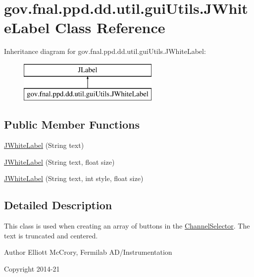 \hypertarget{classgov_1_1fnal_1_1ppd_1_1dd_1_1util_1_1guiUtils_1_1JWhiteLabel}{\section{gov.\-fnal.\-ppd.\-dd.\-util.\-gui\-Utils.\-J\-White\-Label Class Reference}
\label{classgov_1_1fnal_1_1ppd_1_1dd_1_1util_1_1guiUtils_1_1JWhiteLabel}
}
Inheritance diagram for gov.\-fnal.\-ppd.\-dd.\-util.\-gui\-Utils.\-J\-White\-Label\-:\begin{figure}[H]
\begin{center}
\leavevmode
\includegraphics[height=2.000000cm]{classgov_1_1fnal_1_1ppd_1_1dd_1_1util_1_1guiUtils_1_1JWhiteLabel}
\end{center}
\end{figure}
\subsection*{Public Member Functions}
\begin{DoxyCompactItemize}
\item 
\hyperlink{classgov_1_1fnal_1_1ppd_1_1dd_1_1util_1_1guiUtils_1_1JWhiteLabel_aba0b416af91c261f39ba3a495a04c7cc}{J\-White\-Label} (String text)
\item 
\hyperlink{classgov_1_1fnal_1_1ppd_1_1dd_1_1util_1_1guiUtils_1_1JWhiteLabel_a06b0ad34fb1e885990a358d562ed2daa}{J\-White\-Label} (String text, float size)
\item 
\hyperlink{classgov_1_1fnal_1_1ppd_1_1dd_1_1util_1_1guiUtils_1_1JWhiteLabel_a7c4319d123b76e2da1c282bac6b2bafb}{J\-White\-Label} (String text, int style, float size)
\end{DoxyCompactItemize}


\subsection{Detailed Description}
This class is used when creating an array of buttons in the \hyperlink{classgov_1_1fnal_1_1ppd_1_1dd_1_1ChannelSelector}{Channel\-Selector}. The text is truncated and centered.

\begin{DoxyAuthor}{Author}
Elliott Mc\-Crory, Fermilab A\-D/\-Instrumentation 
\end{DoxyAuthor}
\begin{DoxyCopyright}{Copyright}
2014-\/21 
\end{DoxyCopyright}


